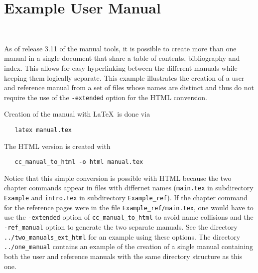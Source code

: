 
\chapter{Example User Manual}
\\

As of release 3.11 of the manual tools, it is possible to create more than    
one manual in a single document that share a table of contents, bibliography
and index.  This allows for easy hyperlinking between the different manuals
while keeping them logically separate.  This example illustrates the creation
of a user and reference manual from a set of files whose names are distinct
and thus do not require the use of the \texttt{-extended} option for the
HTML conversion.

Creation of the manual with \LaTeX\ is done via
\begin{verbatim}
   latex manual.tex
\end{verbatim}
The HTML version is created with
\begin{verbatim}
   cc_manual_to_html -o html manual.tex
\end{verbatim}
Notice that this simple conversion is possible with HTML because the two
chapter commands appear in files with differnet names (\texttt{main.tex} 
in subdirectory \texttt{Example} and \texttt{intro.tex} in subdirectory
\texttt{Example\_ref}).  If the chapter command for the reference pages
were in the file \texttt{Example\_ref/main.tex}, one would have to use
the \texttt{-extended} option of \texttt{cc\_manual\_to\_html} to avoid
name collisions and the \texttt{-ref\_manual} option to generate the two
separate manuals.  See the directory \texttt{../two\_manuals\_ext\_html} for an
example using these options.  The directory \texttt{../one\_manual} contains
an example of the creation of a single manual containing both the user
and reference manuals with the same directory structure as this one.

